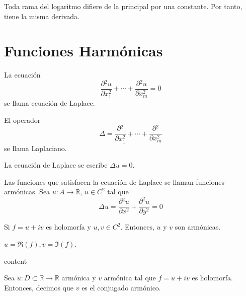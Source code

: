 \begin{obs}
  Toda rama del logaritmo difiere de la principal por una constante. Por tanto, tiene la misma derivada.
\end{obs}

\section{Funciones Harmónicas}

\begin{defn}
  La ecuación
  \[ 
    \frac{\partial{^{2}u}}{\partial{x_{1}^{2}}} + \cdots +  \frac{\partial{^{2}u}}{\partial{x_{m}^{2}}} = 0
  \] 
  se llama ecuación de Laplace.
\end{defn}

\begin{defn}[Laplaciano]
  El operador
  \[ 
    \Delta = \frac{\partial{^{2}}}{\partial{x_{1}^{2}}} + \cdots +  \frac{\partial{^{2}}}{\partial{x_{m}^{2}}}
  \] 
  se llama Laplaciano.
\end{defn}

\begin{obs}
  La ecuación de Laplace se escribe $\Delta u = 0$.
\end{obs}

\begin{defn}
  Las funciones que satisfacen la ecuación de Laplace se llaman funciones armónicas. Sea $u: A \to \mathbb{R}$, $u \in C^{2}$ tal que 
  \[ 
    \Delta u = \frac{\partial{^{2}u}}{\partial{x^{2}}} + \frac{\partial^2{u}}{\partial{y}^2} = 0 
  \] 
\end{defn}

\begin{theo}
  Si $f = u + i v$ es holomorfa y $u, v \in C^{2}$. Entonces, $u$ y $v$ son armónicas.
\end{theo}

\begin{obs}
  $u = \Re(f), v = \Im(f)$.
\end{obs}

\begin{dem}
  content
\end{dem}

\begin{defn}
  Sea $u: D \subset \mathbb{R} \to \mathbb{R}$ armónica y $v$ armónica tal que $f = u + i v$ es holomorfa. Entonces, decimos que $v$ es el conjugado armónico.
\end{defn}

